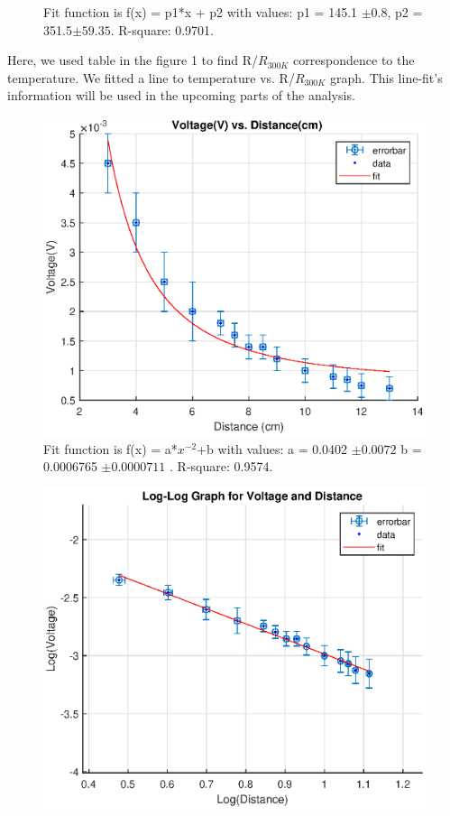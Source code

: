 \documentclass[11pt,a4paper]{article}
\begin{document}
{\begin{figure}[H]
\begin{center}
        	\end{center}
        	\caption{Fit function is  f(x) = p1*x + p2 with values: p1 =       145.1 $\pm0.8$, p2 =  351.5$\pm59.35$. R-square: 0.9701.}
        \end{figure}
    Here, we used table in the figure 1 to find R/$R_{300K}$ correspondence to the temperature. We fitted a line to temperature vs. R/$R_{300K}$ graph. This line-fit's information will be used in the upcoming parts of the analysis.
    \begin{figure}[H]
    	\begin{center}
    		\includegraphics[scale=0.7]{inverse.eps}
    	\end{center}
    	\caption{Fit function is   f(x) = a*$x^{-2}$+b with values: a =      0.0402 $ \pm0.0072$ 
    		b =   0.0006765  $\pm0.0000711$ . R-square: 0.9574.}
    \end{figure}
\begin{figure}[H]
	\begin{center}
		\includegraphics[scale=0.7]{inverselog.eps}

\end{center}
\end{figure}}
\end{document}
